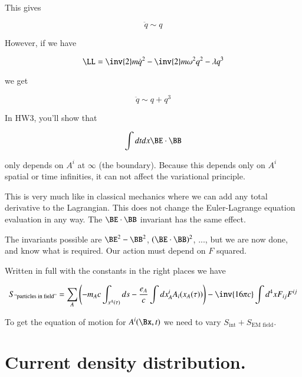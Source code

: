 This gives 

\begin{equation}\label{eqn:relativisticElectrodynamicsL12:290}
\ddot{q} \sim q
\end{equation}

However, if we have

\begin{equation}\label{eqn:relativisticElectrodynamicsL12:310}
\LL = \inv{2} m \dot{q}^2 - \inv{2} m \omega^2 q^2 - \lambda q^3
\end{equation}

we get

\begin{equation}\label{eqn:relativisticElectrodynamicsL12:330}
\ddot{q} \sim q + q^3
\end{equation}

In HW3, you'll show that 

\begin{equation}\label{eqn:relativisticElectrodynamicsL12:350}
\int dt dx \BE \cdot \BB
\end{equation}

only depends on $A^i$ at $\infty$ (the boundary).  Because this depends only on $A^i$ spatial or time infinities, it can not affect the variational principle.

This is very much like in classical mechanics where we can add any total derivative to the Lagrangian.  This does not change the Euler-Lagrange equation evaluation in any way.  The $\BE \cdot \BB$ invariant has the same effect.

The invariants possible are $\BE^2 - \BB^2$, $(\BE \cdot \BB)^2$, ..., but we are now done, and know what is required.  Our action must depend on $F$ squared.

Written in full with the constants in the right places we have

\begin{equation}\label{eqn:relativisticElectrodynamicsL12:370}
S_{\text{``particles in field''}}
= \sum_A \left( -m_A c \int_{x^A(\tau)} ds - \frac{e_A}{c} \int dx^i_A A_i(x_A(\tau))
\right)
- \inv{16 \pi c} \int d^4 x F_{ij} F^{ij}
\end{equation}

To get the equation of motion for $A^i(\Bx, t)$ we need to vary $S_{\text{int}} + S_{\text{EM field}}$.

\section{Current density distribution.}

